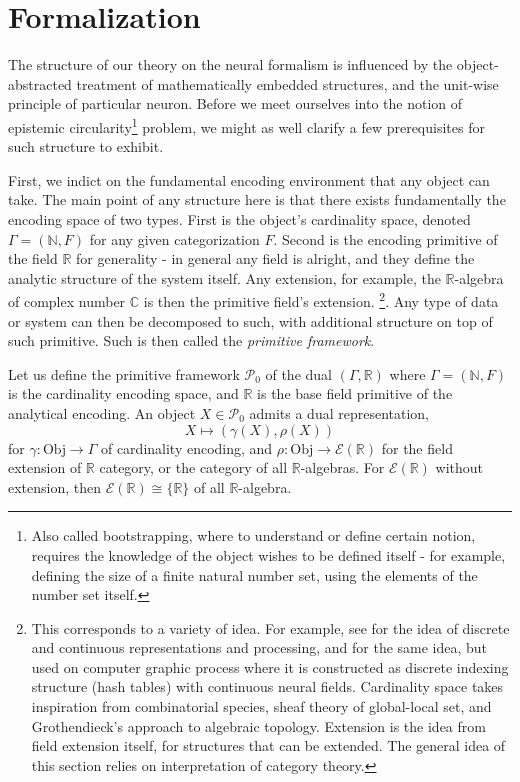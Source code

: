 \section{Formalization}

The structure of our theory on the neural formalism is influenced by the object-abstracted treatment of mathematically embedded structures, and the unit-wise principle of particular neuron. Before we meet ourselves into the notion of epistemic circularity\footnote{Also called bootstrapping, where to understand or define certain notion, requires the knowledge of the object wishes to be defined itself - for example, defining the size of a finite natural number set, using the elements of the number set itself.} problem, we might as well clarify a few prerequisites for such structure to exhibit. 

First, we indict on the fundamental encoding environment that any object can take. The main point of any structure here is that there exists fundamentally the encoding space of two types. First is the object's cardinality space, denoted $\Gamma=(\mathbb{N},F)$ for any given categorization $F$. Second is the encoding primitive of the field $\mathbb{R}$ for generality - in general any field is alright, and they define the analytic structure of the system itself. Any extension, for example, the $\mathbb{R}$-algebra of complex number $\mathbb{C}$ is then the primitive field's extension. \footnote{This corresponds to a variety of idea. For example, see \cite{Cartuyvels_2021} for the idea of discrete and continuous representations and processing, and \cite{M_ller_2022} for the same idea, but used on computer graphic process where it is constructed as discrete indexing structure (hash tables) with continuous neural fields. Cardinality space takes inspiration from combinatorial species, sheaf theory of global-local set, and Grothendieck's approach to algebraic topology. Extension is the idea from field extension itself, for structures that can be extended. The general idea of this section relies on interpretation of category theory.}. Any type of data or system can then be decomposed to such, with additional structure on top of such primitive. Such is then called the \textit{primitive framework}. 

\begin{definition}
    Let us define the primitive framework $\mathcal{P}_{0}$ of the dual $(\Gamma, \mathbb{R})$ where $\Gamma=(\mathbb{N},F)$ is the cardinality encoding space, and $\mathbb{R}$ is the base field primitive of the analytical encoding. An object $X\in \mathcal{P}_{0}$ admits a dual representation, 
    \begin{equation}
        X \mapsto (\gamma(X),\rho(X))
    \end{equation}
    for $\gamma: \mathrm{Obj}\to \Gamma$ of cardinality encoding, and $\rho:\mathrm{Obj}\to\mathcal{E}(\mathbb{R})$ for the field extension of $\mathbb{R}$ category, or the category of all $\mathbb{R}$-algebras. For $\mathcal{E}(\mathbb{R})$ without extension, then $\mathcal{E}(\mathbb{R})\cong \{\mathbb{R}\}$ of all $\mathbb{R}$-algebra. 
\end{definition}

